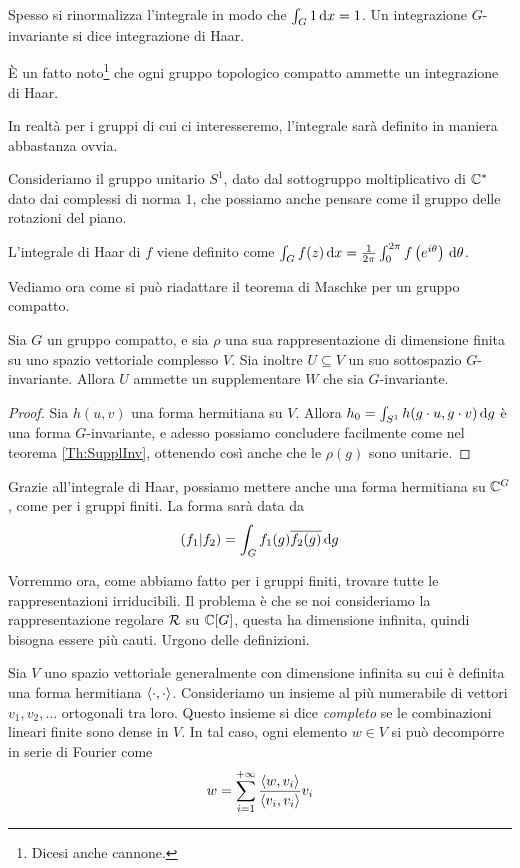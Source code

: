 	Spesso si rinormalizza l'integrale in modo che $\int_{G} 1 \, \textrm{d} x=1$. Un integrazione $G$-invariante si dice integrazione di Haar.
	
	\`E un fatto noto\footnote{Dicesi anche cannone.} che ogni gruppo topologico compatto ammette un integrazione di Haar.
	
	In realtà per i gruppi di cui ci interesseremo, l'integrale sarà definito in maniera abbastanza ovvia.
	
	\begin{myexample}
		Consideriamo il gruppo unitario $S^1$, dato dal sottogruppo moltiplicativo di $\mathbb C^*$ dato dai complessi di norma $1$, che possiamo anche pensare come il gruppo delle rotazioni del piano.
		
		L'integrale di Haar di $f$ viene definito come $\int_{G} f(z) \, \textrm{d} x = \frac1{2\pi}\int_0^{2\pi} f\left(e^{i\theta}\right) \, \textrm{d} \theta$.
	\end{myexample}

	Vediamo ora come si può riadattare il teorema di Maschke per un gruppo compatto.
	
	\begin{mytheorem}
		Sia $G$ un gruppo compatto, e sia $\rho$ una sua rappresentazione di dimensione finita su uno spazio vettoriale complesso $V$. Sia inoltre $U \subseteq V$ un suo sottospazio $G$-invariante. Allora $U$ ammette un supplementare $W$ che sia $G$-invariante.
	\end{mytheorem}
	\begin{proof}
		Sia $h(u,v)$ una forma hermitiana su $V$. Allora $h_0=\int_{S^1} h(g\cdot u, g\cdot v)\, \textrm{d} g$ è una forma $G$-invariante, e adesso possiamo concludere facilmente come nel teorema \ref{Th:SupplInv}, ottenendo così anche che le $\rho(g)$ sono unitarie.  
	\end{proof}
	
	Grazie all'integrale di Haar, possiamo mettere anche una forma hermitiana su $\mathbb C^{G}$, come per i gruppi finiti. La forma sarà data da
	\[
		\left(f_1 | f_2\right) = \int_G f_1(g)\overline{f_2(g)} \, \textrm{d} g 
	\]
	
	Vorremmo ora, come abbiamo fatto per i gruppi finiti, trovare tutte le rappresentazioni irriducibili. Il problema è che se noi consideriamo la rappresentazione regolare $\mathcal R$ su $\mathbb C[G]$, questa ha dimensione infinita, quindi bisogna essere più cauti. Urgono delle definizioni.
	
	\begin{mydef}
		Sia $V$ uno spazio vettoriale generalmente con dimensione infinita su cui è definita una forma hermitiana $\langle\cdot , \cdot\rangle$. Consideriamo un insieme al più numerabile di vettori $v_1, v_2, \dots$ ortogonali tra loro. Questo insieme si dice \emph{completo} se le combinazioni lineari finite sono dense in $V$. In tal caso, ogni elemento $w\in V$ si può decomporre in serie di Fourier come
		\[
			w = \sum_{i=1}^{+\infty} \frac{\langle w , v_i\rangle}{\langle v_i , v_i\rangle}v_i
		\]
	\end{mydef}

